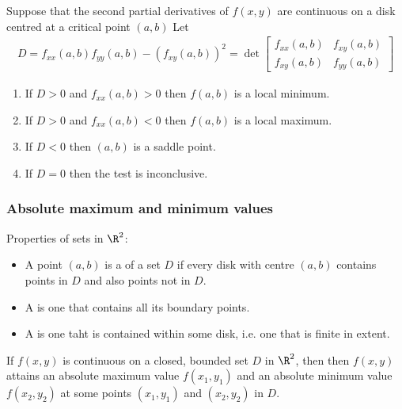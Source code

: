 \documentclass{article}
\begin{document}
\begin{theorem}
    Suppose that the second partial derivatives of $f(x,y)$ are continuous
    on a disk centred at a critical point $(a,b)$ Let
    \begin{align*}
        D = f_{xx}(a,b)f_{yy}(a,b) -\left(f_{xy}(a,b)\right)^2
        = \det\begin{bmatrix}
            f_{xx}(a,b) &f_{xy}(a,b)\\
            f_{xy}(a,b) &f_{yy}(a,b) 
        \end{bmatrix}
    \end{align*}
    \begin{enumerate}
        \item If $D>0$ and $f_{xx}(a,b)>0$ then $f(a,b)$ is a local minimum.
        \item If $D>0$ and $f_{xx}(a,b)<0$ then $f(a,b)$ is a local maximum.
        \item If $D<0$ then $(a,b)$ is a saddle point.
        \item If $D=0$ then the test is inconclusive.
    \end{enumerate}
\end{theorem}

\subsubsection{Absolute maximum and minimum values}

\begin{definition}
    Properties of sets in $\R^2$:
    \begin{itemize}
        \item A point $(a,b)$ is a  of a set $D$ if
        every disk with centre $(a,b)$ contains points in $D$ and also points
        not in $D$.
        \item A  is one that contains all its boundary points.
        \item A  is one taht is contained within some disk, i.e.
        one that is finite in extent.
    \end{itemize}
\end{definition}
\begin{theorem}
    If $f(x,y)$ is continuous on a closed, bounded set $D$ in $\R^2$, then
    then $f(x,y)$ attains an absolute maximum value $f(x_1, y_1)$ and an
    absolute minimum value $f(x_2, y_2)$ at some points $(x_1, y_1)$ and
    $(x_2, y_2)$ in $D$. 
\end{theorem}
\end{document}
